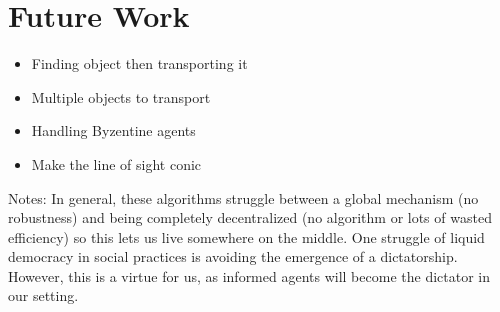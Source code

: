 \documentclass[12pt]{article}
\begin{document}
\section{Future Work}
\begin{itemize}
\item Finding object then transporting it
\item Multiple objects to transport
\item Handling Byzentine agents
\item Make the line of sight conic
\end{itemize}

Notes:
In general, these algorithms struggle between a global mechanism (no robustness) and being completely decentralized (no algorithm or lots of wasted efficiency) so this lets us live somewhere on the middle.
One struggle of liquid democracy in social practices is avoiding the emergence of a dictatorship.
However, this is a virtue for us, as informed agents will become the dictator in our setting.



\end{document}
